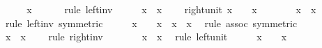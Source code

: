 \begin{isabellebody}
\ \ \isamarkupfalse%
\ \isamarkupfalse%
\ {\isachardoublequoteopen}{\isacharparenleft}x{\isasyminverse}{\isacharparenright}{\isasyminverse}\ {\isasymcirc}\ {\isasymdots}\ {\isacharequal}\ {}{\isachardoublequoteclose}\ \isamarkupfalse%
\ {\isacharparenleft}rule\ left{\isacharunderscore}inv{\isacharparenright}\isanewline
\ \ \isamarkupfalse%
\ \isamarkupfalse%
\ {\isachardoublequoteopen}x\ {\isasymcirc}\ x{\isasyminverse}\ {\isacharequal}\ {}{\isachardoublequoteclose}\ \isacommand{{\isachardot}}\isamarkupfalse%
\isanewline
{}\isamarkupfalse%
%
\endisatagproof
{\isafoldproof}%
%
\isadelimproof
\isanewline
%
\endisadelimproof
\isanewline
{}\isamarkupfalse%
\ right{\isacharunderscore}unit{\isacharcolon}\ {\isachardoublequoteopen}x\ {\isasymcirc}\ {}\ {\isacharequal}\ x{\isachardoublequoteclose}\isanewline
%
\isadelimproof
%
\endisadelimproof
%
\isatagproof
{}\isamarkupfalse%
\ {\isacharminus}\isanewline
\ \ \isamarkupfalse%
\ {\isachardoublequoteopen}{}\ {\isacharequal}\ x{\isasyminverse}\ {\isasymcirc}\ x{\isachardoublequoteclose}\ \isamarkupfalse%
\ {\isacharparenleft}rule\ left{\isacharunderscore}inv\ {\isacharbrackleft}symmetric{\isacharbrackright}{\isacharparenright}\isanewline
\ \ \isamarkupfalse%
\ \isamarkupfalse%
\ {\isachardoublequoteopen}x\ {\isasymcirc}\ {\isasymdots}\ {\isacharequal}\ {\isacharparenleft}x\ {\isasymcirc}\ x{\isasyminverse}{\isacharparenright}\ {\isasymcirc}\ x{\isachardoublequoteclose}\ \isamarkupfalse%
\ {\isacharparenleft}rule\ assoc\ {\isacharbrackleft}symmetric{\isacharbrackright}{\isacharparenright}\isanewline
\ \ \isamarkupfalse%
\ \isamarkupfalse%
\ {\isachardoublequoteopen}x\ {\isasymcirc}\ x{\isasyminverse}\ {\isacharequal}\ {}{\isachardoublequoteclose}\ \isamarkupfalse%
\ {\isacharparenleft}rule\ right{\isacharunderscore}inv{\isacharparenright}\isanewline
\ \ \isamarkupfalse%
\ \isamarkupfalse%
\ {\isachardoublequoteopen}{\isasymdots}\ {\isasymcirc}\ x\ {\isacharequal}\ x{\isachardoublequoteclose}\ \isamarkupfalse%
\ {\isacharparenleft}rule\ left{\isacharunderscore}unit{\isacharparenright}\isanewline
\ \ \isamarkupfalse%
\ \isamarkupfalse%
\ {\isachardoublequoteopen}x\ {\isasymcirc}\ {}\ {\isacharequal}\ x{\isachardoublequoteclose}\ \isacommand{{\isachardot}}\isamarkupfalse%

\end{isabellebody}
